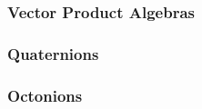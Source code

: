 

\subsubsection{Vector Product Algebras}







\subsubsection{Quaternions}



\subsubsection{Octonions}


